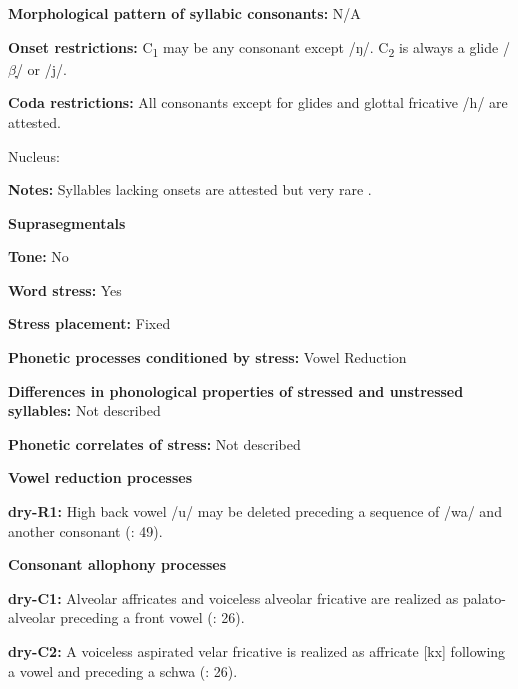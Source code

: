 \textbf{Morphological pattern of syllabic consonants:} N/A



\textbf{Onset restrictions:} C\textsubscript{1} may be any consonant except /ŋ/. C\textsubscript{2} is always a glide /$\beta ̞$/ or /j/.



\textbf{Coda restrictions:} All consonants except for glides and glottal fricative /h/ are attested.



Nucleus:



\textbf{Notes:} Syllables lacking onsets are attested but very rare \citep[19]{Dhakal2012}.



\textbf{Suprasegmentals}



\textbf{Tone:} No



\textbf{Word stress:} Yes



\textbf{Stress placement:} Fixed



\textbf{Phonetic processes conditioned by stress:} Vowel Reduction



\textbf{Differences in phonological properties of stressed and unstressed syllables:} Not described



\textbf{Phonetic correlates of stress:} Not described



\textbf{Vowel reduction processes}



\textbf{dry-R1:} High back vowel /u/ may be deleted preceding a sequence of /wa/ and another consonant (\citealt{KotapishKotapish1973}: 49).



\textbf{Consonant allophony processes}



\textbf{dry-C1:} Alveolar affricates and voiceless alveolar fricative are realized as palato-alveolar preceding a front vowel (\citealt{KotapishKotapish1978}: 26).



\textbf{dry-C2:} A voiceless aspirated velar fricative is realized as affricate [kx] following a vowel and preceding a schwa (\citealt{KotapishKotapish1978}: 26).



